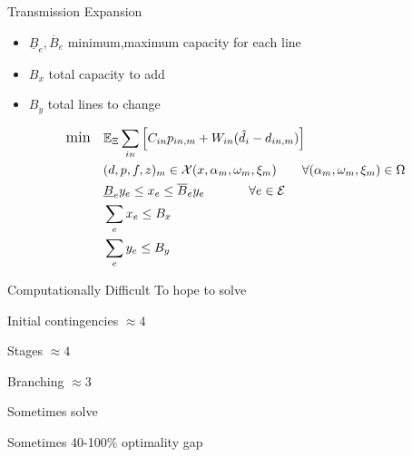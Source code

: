 \begin{frame}{Transmission Expansion}
\begin{itemize}
\item $\underline{B}_e,\overline{B}_e$ minimum,maximum capacity for each line
\item $B_x$ total capacity to add
\item $B_y$ total lines to change
\end{itemize}
\EBR
\begin{subequations}
\begin{align*} \displaystyle
	{\large \mbox{min}} \hspace{10px} &  \Expect_\Xi \sum_{in} \left[ C_{in}  p_{in,m}  + W_{in} (\hat{d}_{i} - d_{in,m}) \right]	\\
	&(d,p,f,z)_m  \in \cX(x,\alpha_m,\omega_m,\xi_m)    \hspace{20px}   \forall (\alpha_m,\omega_m,\xi_m) \in \Omega	\\
	& \underline{B}_e y_e \le x_e \le \overline{B}_e y_e \hspace{35px} \forall e \in \cE\\
	&\sum_e x_e \le B_x 	\\
	& \sum_e y_e \le B_y  
\end{align*}
\end{subequations}
\end{frame}
\begin{frame}{Computationally Difficult}
To hope to solve
\bi
\item Initial contingencies $\approx 4$
\item Stages $\approx 4$
\item Branching $\approx 3$
\ei

Sometimes solve
\bi
\item Sometimes 40-100\% optimality gap
\ei
\end{frame}
